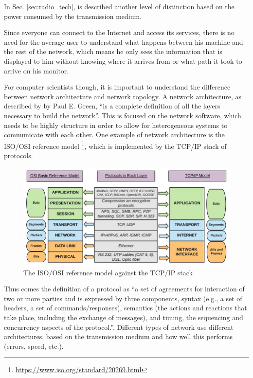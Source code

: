 		In Sec. \ref{sec:radio_tech}, is described another level of distinction based on the power consumed by the transmission medium.
		
		Since everyone can connect to the Internet and access its services, there is no need for the average user to understand what happens between his machine and the rest of the network, which means he only sees the information that is displayed to him without knowing where it arrives from or what path it took to arrive on his monitor.
		
		For computer scientists though, it is important to understand the difference between network architecture and network topology.	
		A network architecture, as described by by Paul E. Green, ``is a complete definition of all the layers necessary to build the network''\cite{nla.cat-vn252493}.
		This is focused on the network software, which needs to be highly structure in order to allow for heterogeneous systems to communicate with each other.
		One example of network architecture is the ISO/OSI reference model \footnote{\url{https://www.iso.org/standard/20269.html}}, which is implemented by the TCP/IP stack of protocols.
		
		\begin{figure}[H]
			\centering
			\includegraphics[width=\textwidth]{resources/img/chap3/isoosi}
			\caption{The ISO/OSI reference model against the TCP/IP stack}
		\end{figure}
		
		Thus comes the definition of a protocol as ``a set of agreements for interaction of two or more parties and is expressed by three components, syntax (e.g., a set of headers, a set of commands/responses), semantics (the actions and reactions that take place, including the exchange of messages), and timing, the sequencing and concurrency aspects of the protocol.''\cite{nla.cat-vn252493}.
		Different types of network use different architectures, based on the transmission medium and how well this performs (errors, speed, etc.).
		
